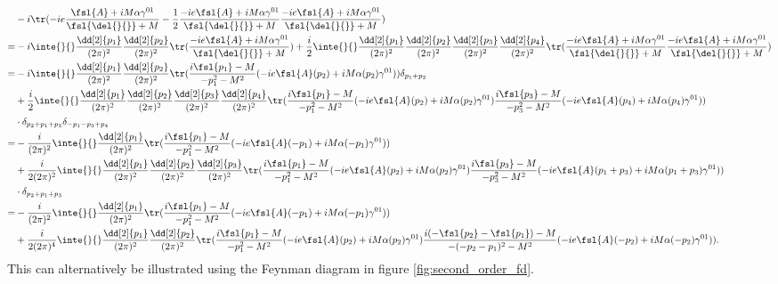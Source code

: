 \begin{align*}
	 &-i\tr(-ie\frac{\fsl{A} + iM\alpha\gamma^{01}}{\fsl{\del{}{}} + M} - \frac{1}{2}\frac{-ie\fsl{A} + iM\alpha\gamma^{01}}{\fsl{\del{}{}} + M}\frac{-ie\fsl{A} + iM\alpha\gamma^{01}}{\fsl{\del{}{}} + M}) \\
	=& -i\inte{}{}\frac{\dd[2]{p_{1}}}{(2\pi)^{2}}\frac{\dd[2]{p_{2}}}{(2\pi)^{2}}\tr(\frac{-ie\fsl{A} + iM\alpha\gamma^{01}}{\fsl{\del{}{}} + M}) + \frac{i}{2}\inte{}{}\frac{\dd[2]{p_{1}}}{(2\pi)^{2}}\frac{\dd[2]{p_{2}}}{(2\pi)^{2}}\frac{\dd[2]{p_{3}}}{(2\pi)^{2}}\frac{\dd[2]{p_{4}}}{(2\pi)^{2}}\tr(\frac{-ie\fsl{A} + iM\alpha\gamma^{01}}{\fsl{\del{}{}} + M}\frac{-ie\fsl{A} + iM\alpha\gamma^{01}}{\fsl{\del{}{}} + M}) \\
	=& -i\inte{}{}\frac{\dd[2]{p_{1}}}{(2\pi)^{2}}\frac{\dd[2]{p_{2}}}{(2\pi)^{2}}\tr(\frac{i\fsl{p_{1}} - M}{-p_{1}^{2} - M^{2}}(-ie\fsl{A}(p_{2}) + iM\alpha(p_{2})\gamma^{01}))\delta_{p_{1} + p_{2}} \\
	 &+ \frac{i}{2}\inte{}{}\frac{\dd[2]{p_{1}}}{(2\pi)^{2}}\frac{\dd[2]{p_{2}}}{(2\pi)^{2}}\frac{\dd[2]{p_{3}}}{(2\pi)^{2}}\frac{\dd[2]{p_{4}}}{(2\pi)^{2}}\tr(\frac{i\fsl{p_{1}} - M}{-p_{1}^{2} - M^{2}}(-ie\fsl{A}(p_{2}) + iM\alpha(p_{2})\gamma^{01})\frac{i\fsl{p_{3}} - M}{-p_{3}^{2} - M^{2}}(-ie\fsl{A}(p_{4}) + iM\alpha(p_{4})\gamma^{01})) \\
	 &\cdot\delta_{p_{2} + p_{1} + p_{3}}\delta_{-p_{1} - p_{3} + p_{4}} \\
	=& -\frac{i}{(2\pi)^{2}}\inte{}{}\frac{\dd[2]{p_{1}}}{(2\pi)^{2}}\tr(\frac{i\fsl{p_{1}} - M}{-p_{1}^{2} - M^{2}}(-ie\fsl{A}(-p_{1}) + iM\alpha(-p_{1})\gamma^{01})) \\
	 &+ \frac{i}{2(2\pi)^{2}}\inte{}{}\frac{\dd[2]{p_{1}}}{(2\pi)^{2}}\frac{\dd[2]{p_{2}}}{(2\pi)^{2}}\frac{\dd[2]{p_{3}}}{(2\pi)^{2}}\tr(\frac{i\fsl{p_{1}} - M}{-p_{1}^{2} - M^{2}}(-ie\fsl{A}(p_{2}) + iM\alpha(p_{2})\gamma^{01})\frac{i\fsl{p_{3}} - M}{-p_{3}^{2} - M^{2}}(-ie\fsl{A}(p_{1} + p_{3}) + iM\alpha(p_{1} + p_{3})\gamma^{01})) \\
	 &\cdot\delta_{p_{2} + p_{1} + p_{3}} \\
	=& -\frac{i}{(2\pi)^{2}}\inte{}{}\frac{\dd[2]{p_{1}}}{(2\pi)^{2}}\tr(\frac{i\fsl{p_{1}} - M}{-p_{1}^{2} - M^{2}}(-ie\fsl{A}(-p_{1}) + iM\alpha(-p_{1})\gamma^{01})) \\
	 &+ \frac{i}{2(2\pi)^{4}}\inte{}{}\frac{\dd[2]{p_{1}}}{(2\pi)^{2}}\frac{\dd[2]{p_{2}}}{(2\pi)^{2}}\tr(\frac{i\fsl{p_{1}} - M}{-p_{1}^{2} - M^{2}}(-ie\fsl{A}(p_{2}) + iM\alpha(p_{2})\gamma^{01})\frac{i(-\fsl{p_{2}} - \fsl{p_{1}}) - M}{-(-p_{2} - p_{1})^{2} - M^{2}}(-ie\fsl{A}(-p_{2}) + iM\alpha(-p_{2})\gamma^{01})).
\end{align*}
This can alternatively be illustrated using the Feynman diagram in figure \ref{fig:second_order_fd}.

